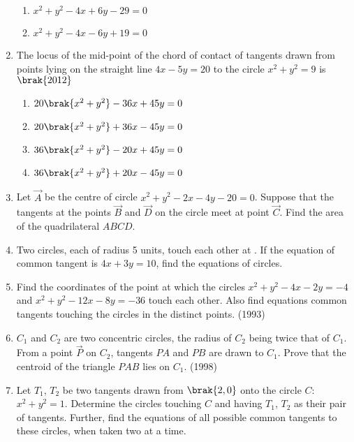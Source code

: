 \begin{enumerate}
\begin{multicols}{2}
\begin{enumerate}
             \item $x^2+y^2-4x+6y-29=0$
             \item $x^2+y^2-4x-6y+19=0$
             \end{enumerate}
\end{multicols}
             \item The locus of the mid-point of the chord of contact of tangents drawn from points lying on the straight line $4x-5y=20$ to the circle $x^2+y^2=9$ is
                 \hfill$\brak{2012}$
             \begin{multicols}{2}
\begin{enumerate}
                 \item $20\brak{x^2+y^2}-36x+45y=0$
                 \item $20\brak{x^2+y^2}+36x-45y=0$
                 \item $36\brak{x^2+y^2}-20x+45y=0$
                 \item $36\brak{x^2+y^2}+20x-45y=0$
             \end{enumerate}
             \end{multicols}
\item Let $\vec{A}$ be the centre of circle $x^2+y^2-2x-4y-20=0$. Suppose that the tangents at the points $\vec{B}$ and $\vec{D}$ on the circle meet at point $\vec{C}$. Find the area of the quadrilateral $ABCD$.
%
\hfill {}
\item Two circles,  each of radius 5 units,  touch each other at . If the equation of common tangent is $4x+3y=10$,  find the equations of circles.
%
\hfill {}
\item Find the coordinates of the point at which the circles $x^2+y^2-4x-2y=-4$ and $x^2+y^2-12x-8y=-36$ touch each other. Also find equations common tangents touching the circles in the distinct points.                        
%
\hfill(1993)
\item $C_{1}$ and $C_{2}$ are two concentric circles,  the radius of $C_{2}$ being twice that of $C_{1}$. From a point $\vec{P}$ on $C_{2}$,  tangents $PA$ and $PB$ are drawn to $C_{1}$. Prove that the centroid of the triangle $PAB$ lies on $C_{1}$.
	           \hfill(1998)
%
%
%
%
\item Let $T_{1}$,  $T_{2}$ be two tangents drawn from $\brak{2, 0}$ onto the circle $C$:$x^2+y^2=1$. Determine the circles touching $C$ and having $T_{1}$,  $T_{2}$ as their pair of tangents. Further,  find the equations of all possible common tangents to these circles,  when taken two at a time.

\end{enumerate}
